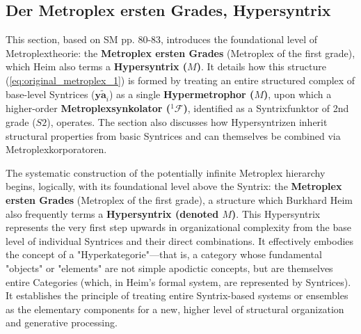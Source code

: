 \documentclass[12pt]{article}
\newcommand{\syntrix}{\bm{y\widetilde{a}}}
\def\metroplex#1#2{M}%
\newcommand{\hypersyntrix}{\metroplex{1}{F}}
\newcommand{\hypermetrophor}[1]{%
  \metroplex{#1}{a}%
}
\newcommand{\metroplexsynkolator}[1]{{}^{#1}\mathcal{F}}
\begin{document}
\subsection{Der Metroplex ersten Grades, Hypersyntrix}
\label{sec:hypersyntrix}

This section, based on SM pp. 80-83, introduces the foundational level of Metroplextheorie: the \textbf{Metroplex ersten Grades} (Metroplex of the first grade), which Heim also terms a \textbf{Hypersyntrix (\(\hypersyntrix\))}. It details how this structure (\eqref{eq:original_metroplex_1}) is formed by treating an entire structured complex of base-level Syntrices (\(\syntrix_i\)) as a single \textbf{Hypermetrophor (\(\hypermetrophor{1}\))}, upon which a higher-order \textbf{Metroplexsynkolator (\(\metroplexsynkolator{1}\))}, identified as a Syntrixfunktor of 2nd grade (\(S2\)), operates. The section also discusses how Hypersyntrizen inherit structural properties from basic Syntrices and can themselves be combined via Metroplexkorporatoren.

The systematic construction of the potentially infinite Metroplex hierarchy begins, logically, with its foundational level above the Syntrix: the \textbf{Metroplex ersten Grades} (Metroplex of the first grade), a structure which Burkhard Heim also frequently terms a \textbf{Hypersyntrix (denoted \(\hypersyntrix\))}. This Hypersyntrix represents the very first step upwards in organizational complexity from the base level of individual Syntrices and their direct combinations. It effectively embodies the concept of a "Hyperkategorie"—that is, a category whose fundamental "objects" or "elements" are not simple apodictic concepts, but are themselves entire Categories (which, in Heim's formal system, are represented by Syntrices). It establishes the principle of treating entire Syntrix-based systems or ensembles as the elementary components for a new, higher level of structural organization and generative processing.
\end{document}
